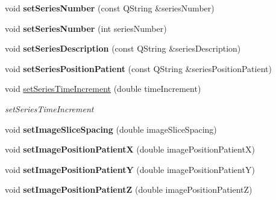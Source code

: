 \begin{DoxyCompactItemize}
\item 
\mbox{\label{class_series_info_a1745cd80a9707532c530f9128b1c2bc0}} 
void {\bfseries set\+Series\+Number} (const Q\+String \&series\+Number)
\item 
\mbox{\label{class_series_info_a5fcc71c04f2a3389bf323d8a1f2e2c48}} 
void {\bfseries set\+Series\+Number} (int series\+Number)
\item 
\mbox{\label{class_series_info_a80045682d0da7012141780b03325cea5}} 
void {\bfseries set\+Series\+Description} (const Q\+String \&series\+Description)
\item 
\mbox{\label{class_series_info_ac1600dfc5f367a0c940c28c07dfba526}} 
void {\bfseries set\+Series\+Position\+Patient} (const Q\+String \&series\+Position\+Patient)
\item 
void \hyperlink{class_series_info_aacffddaa0cdb2dd931b89e57d429912e}{set\+Series\+Time\+Increment} (double time\+Increment)
\begin{DoxyCompactList}\small\item\em set\+Series\+Time\+Increment \end{DoxyCompactList}\item 
\mbox{\label{class_series_info_aedd83f1d0f57fe35ea8f8148205d974e}} 
void {\bfseries set\+Image\+Slice\+Spacing} (double image\+Slice\+Spacing)
\item 
\mbox{\label{class_series_info_a7d8d7d402a289198ff7412cbe02ec8c5}} 
void {\bfseries set\+Image\+Position\+PatientX} (double image\+Position\+PatientX)
\item 
\mbox{\label{class_series_info_ae68eebb709fc373f180928bbce3fd0a5}} 
void {\bfseries set\+Image\+Position\+PatientY} (double image\+Position\+PatientY)
\item 
\mbox{\label{class_series_info_aa4ce9146cead6bfc3e01d99e1ecbca40}} 
void {\bfseries set\+Image\+Position\+PatientZ} (double image\+Position\+PatientZ)
\item 
\mbox{\label{class_series_info_afd896e51680aa3bc2ca55128c525ca38}} 

\end{DoxyCompactItemize}
